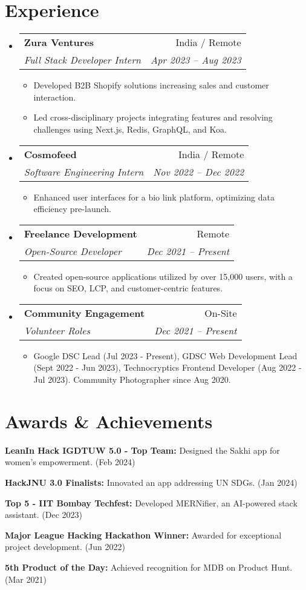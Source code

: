 \documentclass[letterpaper,11pt]{article}
\makeatletter
\newcommand{\resumeItem}[1]{
  \item\small{
    {#1 \vspace{-2pt}}
  }
}
\newcommand{\resumeSubheading}[4]{
  \vspace{-2pt}\item
    \begin{tabular*}{0.97\textwidth}[t]{l@{\extracolsep{\fill}}r}
      \textbf{#1} & #2 \\
      \textit{\small#3} & \textit{\small #4} \\
    \end{tabular*}\vspace{-7pt}
}
\newcommand{\resumeSubHeadingListStart}{\begin{itemize}[leftmargin=0.15in, label={}]}
\newcommand{\resumeSubHeadingListEnd}{\end{itemize}}
\newcommand{\resumeItemListStart}{\begin{itemize}}
\newcommand{\resumeItemListEnd}{\end{itemize}\vspace{-5pt}}
\makeatother
\begin{document}

\section{Experience}
    \resumeSubHeadingListStart
    
    \resumeSubheading{Zura Ventures}{India / Remote}
    {Full Stack Developer Intern}{Apr 2023 -- Aug 2023}
    \resumeItemListStart
    \resumeItem{Developed B2B Shopify solutions increasing sales and customer interaction.}
    \resumeItem{Led cross-disciplinary projects integrating features and resolving challenges using Next.js, Redis, GraphQL, and Koa.}
    \resumeItemListEnd
    
    \resumeSubheading{Cosmofeed}{India / Remote}
    {Software Engineering Intern}{Nov 2022 -- Dec 2022}
    \resumeItemListStart
    \resumeItem{Enhanced user interfaces for a bio link platform, optimizing data efficiency pre-launch.}
    \resumeItemListEnd
    
    \resumeSubheading{Freelance Development}{Remote}{Open-Source Developer}{Dec 2021 -- Present}
    \resumeItemListStart
    \resumeItem{Created open-source applications utilized by over 15,000 users, with a focus on SEO, LCP, and customer-centric features.}
    \resumeItemListEnd

    \resumeSubheading{Community Engagement}{On-Site}{Volunteer Roles}{Dec 2021 -- Present}
    \resumeItemListStart
    \resumeItem{Google DSC Lead (Jul 2023 - Present), GDSC Web Development Lead (Sept 2022 - Jun 2023), Technocryptics Frontend Developer (Aug 2022 - Jul 2023). Community Photographer since Aug 2020.}
    \resumeItemListEnd

    \resumeSubHeadingListEnd


\section{Awards \& Achievements}
  \vspace{2pt}
  \resumeSubHeadingListStart
  \small{
    \item{
    
    \textbf{LeanIn Hack IGDTUW 5.0 - Top Team:}{ Designed the Sakhi app for women's empowerment. (Feb 2024)}
    
    \textbf{HackJNU 3.0 Finalists:}{ Innovated an app addressing UN SDGs. (Jan 2024)}
    
    \textbf{Top 5 - IIT Bombay Techfest:}{ Developed MERNifier, an AI-powered stack assistant. (Dec 2023)}
    
    \textbf{Major League Hacking Hackathon Winner:}{ Awarded for exceptional project development. (Jun 2022)}
    
    \textbf{5th Product of the Day:}{ Achieved recognition for MDB on Product Hunt. (Mar 2021)}

    }}
  \resumeSubHeadingListEnd
\end{document}
